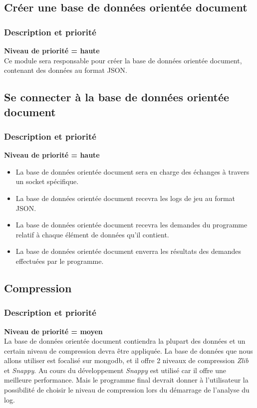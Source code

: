 \documentclass{scrreprt}
\begin{document}
\subsection{Créer une base de données orientée document }

\subsubsection{Description et priorité}
\textbf{Niveau de priorité = haute}\\
Ce module sera responsable pour créer la base de données orientée document, contenant des données au format JSON.
\subsection{Se connecter à la base de données orientée document }
\subsubsection{Description et priorité}
\textbf{Niveau de priorité = haute}\\
\begin{itemize}
\item La base de données orientée document sera en charge des échanges à travers un socket spécifique.
\item La base de données orientée document recevra les logs de jeu au format JSON.
\item La base de données orientée document recevra les demandes du programme relatif à chaque élément de données qu'il contient.
\item La base de données orientée document enverra les résultats des demandes effectuées par le programme.
\end{itemize}


\subsection{Compression}
\subsubsection{Description et priorité}
\textbf{Niveau de priorité = moyen}\\

La base de données orientée document contiendra la plupart des données et un certain niveau de compression devra être appliquée.
La base de données que nous allons utiliser est focalisé sur mongodb, et il offre 2 niveaux de compression \textit{Zlib} et \textit{Snappy}.
Au cours du développement \textit{Snappy} est utilisé car il offre une meilleure performance.
Mais le programme final devrait donner à l'utilisateur la possibilité de choisir le niveau de compression lors du démarrage de l'analyse du log.
\end{document}
